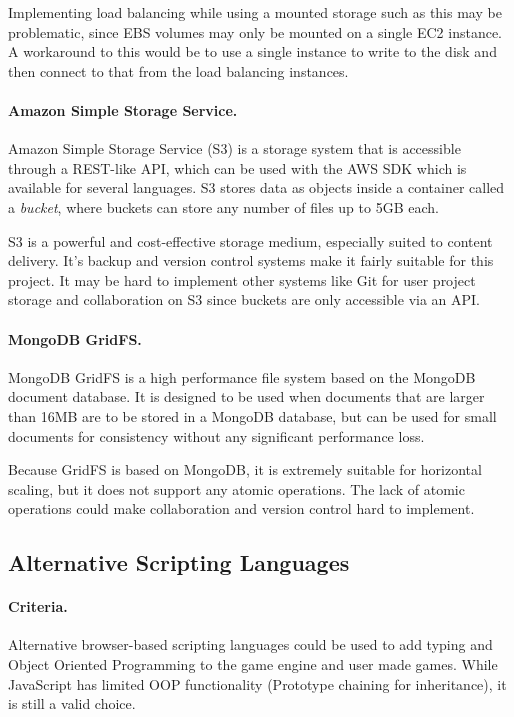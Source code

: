 Implementing load balancing while using a mounted storage such as this may be problematic, since EBS volumes may only be mounted on a single EC2 instance. A workaround to this would be to use a single instance to write to the disk and then connect to that from the load balancing instances.

\paragraph{Amazon Simple Storage Service.}
Amazon Simple Storage Service (S3) is a storage system that is accessible through a REST-like API, which can be used with the AWS SDK which is available for several languages.\cite{awss3} S3 stores data as objects inside a container called a \emph{bucket}, where buckets can store any number of files up to 5GB each.

S3 is a powerful and cost-effective storage medium, especially suited to content delivery. It's backup and version control systems make it fairly suitable for this project.\cite{awss3} It may be hard to implement other systems like Git for user project storage and collaboration on S3 since buckets are only accessible via an API.

\paragraph{MongoDB GridFS.}
MongoDB GridFS is a high performance file system based on the MongoDB document database. It is designed to be used when documents that are larger than 16MB are to be stored in a MongoDB database, but can be used for small documents for consistency without any significant performance loss.\cite{gridfs}

Because GridFS is based on MongoDB, it is extremely suitable for horizontal scaling, but it does not support any atomic operations.\cite{gridfsatomic} The lack of atomic operations could make collaboration and version control hard to implement.

\subsection{Alternative Scripting Languages}
\paragraph{Criteria.}
Alternative browser-based scripting languages could be used to add typing and Object Oriented Programming to the game engine and user made games. While JavaScript has limited OOP functionality (Prototype chaining for inheritance), it is still a valid choice.

